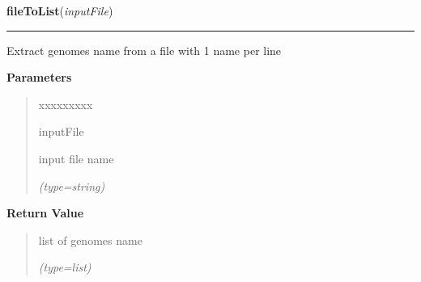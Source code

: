 \hspace{.8\funcindent}\begin{boxedminipage}{\funcwidth}

    \raggedright \textbf{fileToList}(\textit{inputFile})

    \vspace{-1.5ex}

    \rule{\textwidth}{0.5\fboxrule}
\setlength{\parskip}{2ex}
    Extract genomes name from a file with 1 name per line

\setlength{\parskip}{1ex}
      \textbf{Parameters}
      \vspace{-1ex}

      \begin{quote}
        \begin{Ventry}{xxxxxxxxx}

          \item[inputFile]

          input file name

            {\it (type=string)}

        \end{Ventry}

      \end{quote}

      \textbf{Return Value}
    \vspace{-1ex}

      \begin{quote}
      list of genomes name

      {\it (type=list)}

      \end{quote}

    \end{boxedminipage}

    \label{script-FixedVar:makeXML}

    \vspace{0.5ex}


